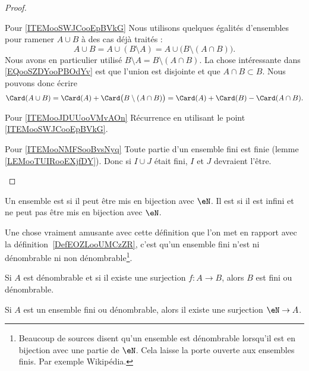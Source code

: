 \begin{proof}
\begin{subproof}
    \item[Pour \ref{ITEMooSWJCooEpBVkG}]
        Nous utilisons quelques égalités d'ensembles pour ramener \( A\cup B\) à des cas déjà traités : 
        \begin{equation}        \label{EQooSZDYooPBOdYv}
            A\cup B=A\cup(B\setminus A)=A\cup\big( B\setminus(A\cap B) \big).
        \end{equation}
        Nous avons en particulier utilisé \( B\setminus A=B\setminus(A\cap B)\). La chose intéressante dans \eqref{EQooSZDYooPBOdYv} est que l'union est disjointe et que \( A\cap B\subset B\). Nous pouvons donc écrire
        \begin{equation}
            \Card(A\cup B)=\Card(A)+\Card\big( B\setminus(A\cap B) \big)=\Card(A)+\Card(B)-\Card(A\cap B).
        \end{equation}
    \item[Pour \ref{ITEMooJDUUooVMvAOn}]
        Récurrence en utilisant le point \ref{ITEMooSWJCooEpBVkG}.
    \item[Pour \ref{ITEMooNMFSooBvsNyq}]
        Toute partie d'un ensemble fini est finie (lemme \ref{LEMooTUIRooEXjfDY}). Donc si \( I\cup J\) était fini, \( I\) et \( J\) devraient l'être.
    \end{subproof}
\end{proof}


\begin{definition}\label{DefEnsembleDenombrable}
    Un ensemble est  si il peut être mis en bijection avec \( \eN\). Il est  si il est infini et ne peut pas être mis en bijection avec \( \eN\).
\end{definition}
Une chose vraiment amusante avec cette définition que l'on met en rapport avec la définition~\ref{DefEOZLooUMCzZR}, c'est qu'un ensemble fini n'est ni dénombrable ni non dénombrable\footnote{Beaucoup de sources disent qu'un ensemble est dénombrable lorsqu'il est en bijection avec une partie de \( \eN\). Cela laisse la porte ouverte aux ensembles finis. Par exemple Wikipédia\cite{ooLMVKooUiQUtb}.}.

\begin{lemma}       \label{LEMooDTAEooIBdHyo}
    Si \( A\) est dénombrable et si il existe une surjection \( f\colon A\to B\), alors \( B\) est fini ou dénombrable.
\end{lemma}




\begin{lemma}       \label{LEMooSRZWooASgEfy}
    Si \( A\) est un ensemble fini ou dénombrable, alors il existe une surjection \( \eN\to A\).
\end{lemma}

